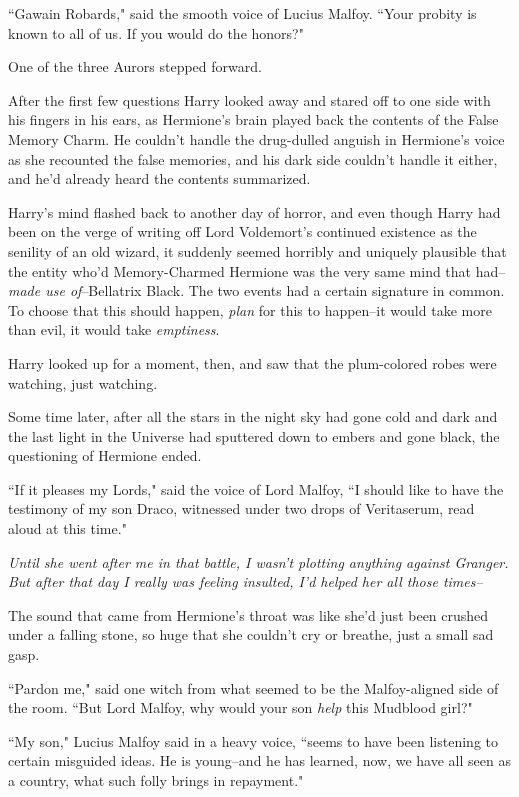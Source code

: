 ``Gawain Robards," said the smooth voice of Lucius Malfoy. ``Your probity is known to all of us. If you would do the honors?"

One of the three Aurors stepped forward.

After the first few questions Harry looked away and stared off to one side with his fingers in his ears, as Hermione's brain played back the contents of the False Memory Charm. He couldn't handle the drug-dulled anguish in Hermione's voice as she recounted the false memories, and his dark side couldn't handle it either, and he'd already heard the contents summarized.

Harry's mind flashed back to another day of horror, and even though Harry had been on the verge of writing off Lord Voldemort's continued existence as the senility of an old wizard, it suddenly seemed horribly and uniquely plausible that the entity who'd Memory-Charmed Hermione was the very same mind that had\---\emph{made use of}\---Bellatrix Black. The two events had a certain signature in common. To choose that this should happen, \emph{plan} for this to happen\---it would take more than evil, it would take \emph{emptiness}.

Harry looked up for a moment, then, and saw that the plum-colored robes were watching, just watching.

Some time later, after all the stars in the night sky had gone cold and dark and the last light in the Universe had sputtered down to embers and gone black, the questioning of Hermione ended.

``If it pleases my Lords," said the voice of Lord Malfoy, ``I should like to have the testimony of my son Draco, witnessed under two drops of Veritaserum, read aloud at this time."

\emph{Until she went after me in that battle, I wasn't plotting anything against Granger. But after that day I really was feeling insulted, I'd helped her all those times\---}

The sound that came from Hermione's throat was like she'd just been crushed under a falling stone, so huge that she couldn't cry or breathe, just a small sad gasp.

``Pardon me," said one witch from what seemed to be the Malfoy-aligned side of the room. ``But Lord Malfoy, why would your son \emph{help} this Mudblood girl?"

``My son," Lucius Malfoy said in a heavy voice, ``seems to have been listening to certain misguided ideas. He is young\---and he has learned, now, we have all seen as a country, what such folly brings in repayment."

